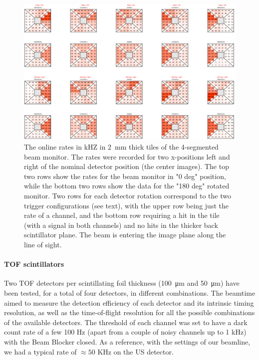 \begin{refsection}
        \begin{figure}
            \centering
            \includegraphics[width=0.9\linewidth]{Figures/muEDM_Dec2023/BeamMonTriang_scanData2023.png}%
            \caption{The online rates in kHZ in 2~mm thick tiles of the 4-segmented beam monitor. The rates were recorded for two x-positions left and right of the nominal detector position (the center images). The top two rows show the rates for the beam monitor in "0 deg" position, while the bottom two rows show the data for the "180 deg" rotated monitor. Two rows for each detector rotation correspond to the two trigger configurations (see text), with the upper row being just the rate of a channel, and the bottom row requiring a hit in the tile (with a signal in both channels) and no hits in the thicker back scintillator plane. The beam is entering the image plane along the line of sight.}
            \label{fig:BeamMonTriang_positionScan}
        \end{figure}

        \paragraph{TOF scintillators}
        Two TOF detectors per scintillating foil thickness (\SI{100}{\micro m} and \SI{50}{\micro m}) have been tested, for a total of four detectors, in different combinations. 
        The beamtime aimed to measure the detection efficiency of each detector and its intrinsic timing resolution, as well as the time-of-flight resolution for all the possible combinations of the available detectors.
        The threshold of each channel was set to have a dark count rate of a few 100 Hz (apart from a couple of noisy channels up to 1 kHz) with the Beam Blocker closed. 
        As a reference, with the settings of our beamline, we had a typical rate of $\approx50$ KHz on the US detector.


\end{refsection}
